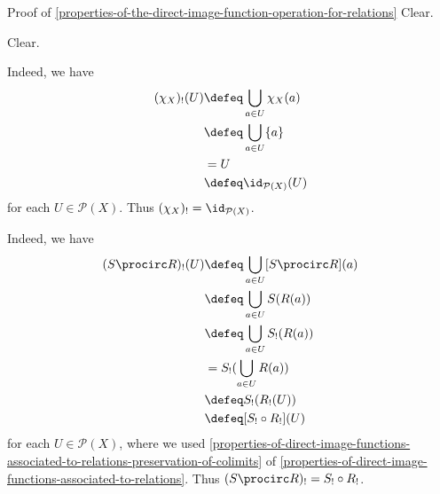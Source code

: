 \begin{Proof}{Proof of \cref{properties-of-the-direct-image-function-operation-for-relations}}%
    Clear.

    Clear.

    Indeed, we have
    \begin{align*}
        (\chi_{X})_{!}(U) &\defeq \bigcup_{a\in U}\chi_{X}(a)\\
                          &\defeq \bigcup_{a\in U}\{a\}\\
                          &=      U\\
                          &\defeq \id_{\mathcal{P}(X)}(U)
    \end{align*}
    for each $U\in\mathcal{P}(X)$. Thus $(\chi_{X})_{!}=\id_{\mathcal{P}(X)}$.

    Indeed, we have
    \begin{align*}
        (S\procirc R)_{!}(U) &\defeq \bigcup_{a\in U}[S\procirc R](a)\\
                             &\defeq \bigcup_{a\in U}S(R(a))\\
                             &\defeq \bigcup_{a\in U}S_{!}(R(a))\\
                             &=      S_{!}(\bigcup_{a\in U}R(a))\\
                             &\defeq S_{!}(R_{!}(U))\\
                             &\defeq [S_{!}\circ R_{!}](U)
    \end{align*}
    for each $U\in\mathcal{P}(X)$, where we used \cref{properties-of-direct-image-functions-associated-to-relations-preservation-of-colimits} of \cref{properties-of-direct-image-functions-associated-to-relations}. Thus $(S\procirc R)_{!}=S_{!}\circ R_{!}$.
\end{Proof}
